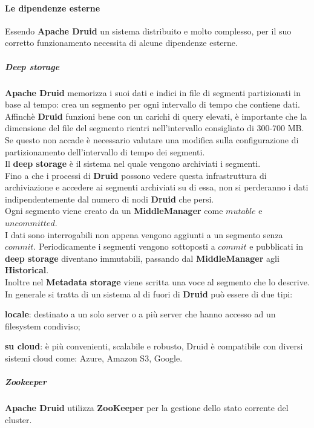 \paragraph{Le dipendenze esterne}
Essendo \textbf{Apache Druid} un sistema distribuito e molto complesso, per il suo corretto funzionamento necessita di alcune dipendenze esterne.\\

\subparagraph{Deep storage}
\textbf{Apache Druid} memorizza i suoi dati e indici in file di segmenti partizionati in base al
tempo:  crea un segmento per ogni intervallo di tempo che contiene dati.\\
Affinchè \textbf{Druid} funzioni bene con un carichi di query elevati, è importante che la dimensione del file
del segmento rientri nell’intervallo consigliato di 300-700 MB. Se questo non accade è necessario valutare 
una modifica sulla configurazione di partizionamento dell’intervallo di tempo dei segmenti.\\
Il \textbf{deep storage} è il sistema nel quale vengono archiviati i segmenti.\\
Fino a che i processi di \textbf{Druid} possono vedere questa infrastruttura di archiviazione e accedere
ai segmenti archiviati su di essa, non si perderanno i dati indipendentemente dal numero
di nodi \textbf{Druid} che persi.\\
Ogni segmento viene creato da un \textbf{MiddleManager} come $mutable$ e $uncommitted$. \\
I dati sono interrogabili non appena vengono aggiunti a un segmento senza $commit$.
Periodicamente i segmenti vengono sottoposti a $commit$ e pubblicati in \textbf{deep storage} diventano immutabili, passando dal \textbf{MiddleManager} agli \textbf{Historical}.
\\Inoltre nel \textbf{Metadata storage} viene scritta una voce al segmento che lo descrive.\\
In generale si tratta di un sistema al di fuori di \textbf{Druid} può essere di due tipi:
\begin{list}{*}
\item 
\textbf{locale}: destinato a un solo server o a più server che hanno accesso ad un filesystem
condiviso;
\item \item \textbf{su cloud}: è più convenienti, scalabile e robusto, Druid è compatibile con diversi sistemi cloud come: Azure,
Amazon S3, Google.
\end{list}
\subparagraph{Zookeeper}
\textbf{Apache Druid} utilizza \textbf{ZooKeeper} per la gestione dello stato corrente del cluster.\\
